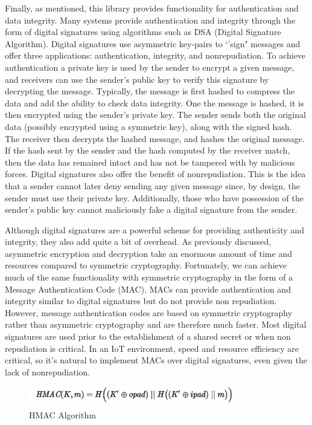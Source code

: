 Finally, as mentioned, this library provides functionality for authentication and data integrity. Many systems provide authentication and integrity through the form of digital signatures using algorithms such as DSA (Digital Signature Algorithm). Digital signatures use asymmetric key-pairs to `'sign" messages and offer three applications: authentication, integrity, and nonrepudiation. To achieve authentication a private key is used by the sender to encrypt a given message, and receivers can use the sender's public key to verify this signature by decrypting the message. Typically, the message is first hashed to compress the data and add the ability to check data integrity. One the message is hashed, it is then encrypted using the sender's private key.  The sender sends both the original data (possibly encrypted using a symmetric key), along with the signed hash. The receiver then decrypts the hashed message, and hashes the original message. If the hash sent by the sender and the hash computed by the receiver match, then the data has remained intact and has not be tampered with by malicious forces. Digital signatures also offer the benefit of nonrepudiation. This is the idea that a sender cannot later deny sending any given message since, by design, the sender must use their private key. Additionally, those who have possession of the sender's public key cannot maliciously fake a digital signature from the sender.

Although digital signatures are a powerful scheme for providing authenticity and integrity, they also add quite a bit of overhead. As previously discussed, asymmetric encryption and decryption take an enormous amount of time and resources compared to symmetric cryptography. Fortunately, we can achieve much of the same functionality with symmetric cryptography in the form of a Message Authentication Code (MAC). MACs can provide authentication and integrity similar to digital signatures but do not provide non repudiation. However, message authentication codes are based on symmetric cryptography rather than asymmetric cryptography and are therefore much faster. Most digital signatures are used prior to the establishment of a shared secret or when non repudiation is critical. In an IoT environment, speed and resource efficiency are critical, so it's natural to implement MACs over digital signatures, even given the lack of nonrepudiation. 

 \begin{figure}[t]
	\centering
	\includegraphics[width=9cm,height=0.7\textheight,keepaspectratio]{./figures/figure_5}
	\center\caption[font=footnote]{HMAC Algorithm}
\end{figure}

